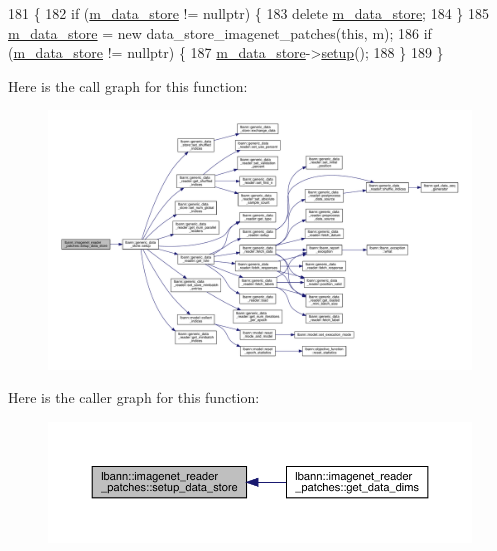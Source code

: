 \begin{DoxyCode}
181                                                        \{
182   \textcolor{keywordflow}{if} (\hyperlink{classlbann_1_1generic__data__reader_aefc076b842933a882214f4f709ca49c9}{m\_data\_store} != \textcolor{keyword}{nullptr}) \{
183     \textcolor{keyword}{delete} \hyperlink{classlbann_1_1generic__data__reader_aefc076b842933a882214f4f709ca49c9}{m\_data\_store};
184   \}
185   \hyperlink{classlbann_1_1generic__data__reader_aefc076b842933a882214f4f709ca49c9}{m\_data\_store} = \textcolor{keyword}{new} data\_store\_imagenet\_patches(\textcolor{keyword}{this}, m);
186   \textcolor{keywordflow}{if} (\hyperlink{classlbann_1_1generic__data__reader_aefc076b842933a882214f4f709ca49c9}{m\_data\_store} != \textcolor{keyword}{nullptr}) \{
187     \hyperlink{classlbann_1_1generic__data__reader_aefc076b842933a882214f4f709ca49c9}{m\_data\_store}->\hyperlink{classlbann_1_1generic__data__store_a1cff17def02ee21b6ca0befeb04bb582}{setup}();
188   \}
189 \}
\end{DoxyCode}
Here is the call graph for this function\+:\nopagebreak
\begin{figure}[H]
\begin{center}
\leavevmode
\includegraphics[width=350pt]{classlbann_1_1imagenet__reader__patches_afad50e94c5d6bde9dff2abe5bad50e11_cgraph}
\end{center}
\end{figure}
Here is the caller graph for this function\+:\nopagebreak
\begin{figure}[H]
\begin{center}
\leavevmode
\includegraphics[width=350pt]{classlbann_1_1imagenet__reader__patches_afad50e94c5d6bde9dff2abe5bad50e11_icgraph}
\end{center}
\end{figure}


